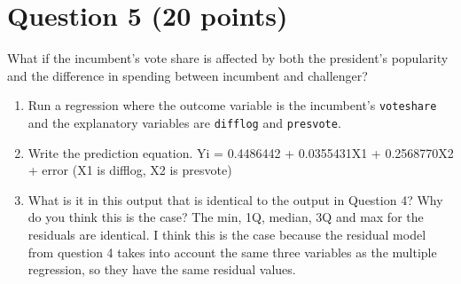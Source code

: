 \documentclass[12pt,letterpaper]{article}
\begin{document}
	\newpage	

\section*{Question 5 (20 points)}
\noindent What if the incumbent's vote share is affected by both the president's popularity and the difference in spending between incumbent and challenger? 
	\begin{enumerate}
		\item Run a regression where the outcome variable is the incumbent's \texttt{voteshare} and the explanatory variables are \texttt{difflog} and \texttt{presvote}.	\vspace{1cm}
 	
		\item Write the prediction equation.	\vspace{1cm}
\noindent Yi = 0.4486442  + 0.0355431X1 +  0.2568770X2 + error (X1 is difflog, X2 is presvote)
		\item What is it in this output that is identical to the output in Question 4? Why do you think this is the case?	\vspace{1cm}
\noindent The min, 1Q, median, 3Q and max for the residuals are identical. I think this is the case because the residual model from question 4 takes into account the same three variables as the multiple regression, so they have the same residual values.
	\end{enumerate}
\end{document}
